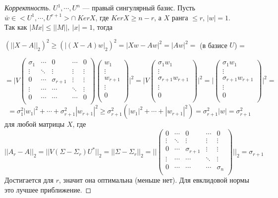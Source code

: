 \begin{proof}[Корректность]
$U^1,\cdots, U^n$ --- правый сингулярный базис.
Пусть $\bar w \in <U^1,\cdots,U^{r+1}> \cap~ Ker X$, где $Ker X \geqslant n-r$, а $X$ ранга $\leqslant r$, $|w|=1$.\\
Так как $|Mx|\leqslant ||M||,~|x|=1$, тогда \begin{center}
    $(||X-A||_2)^2 \geqslant(|(X-A)w|_2)^2=|Xw-Aw|^2=|Aw|^2=$ (в базисе $U$) =
\end{center}
\[=\Bigg| V\begin{pmatrix}
\sigma_1 & \cdots & 0  & \cdots & 0\\
\vdots & \ddots & \vdots & \vdots & \vdots\\
0 & \cdots & \sigma_{r+1} &  \vdots & \vdots\\
\vdots & \cdots & \cdots & \ddots & \vdots\\
0 & \cdots & \cdots & \cdots & 0\\
\end{pmatrix} \begin{pmatrix}
w_1\\
\vdots\\
w_{r+1}\\
\vdots\\
0\\
\end{pmatrix}\Bigg|^2 =\Bigg|V \begin{pmatrix}
\sigma_1 w_1\\
\vdots\\
\sigma_{r+1} w_{r+1}\\
\vdots\\
0\\
\end{pmatrix} \Bigg|^2 =\Bigg| \begin{pmatrix}
\sigma_1 w_1\\
\vdots\\
\sigma_{r+1} w_{r+1}\\
\vdots\\
0\\
\end{pmatrix} \Bigg|^2=\]$$=\sigma_1^2|w_1|^2+\cdots+\sigma_{r+1}^2|w_{r+1}|^2 \geqslant \sigma_{r+1}^2(|w_1|^2+\cdots+|w_{r+1}|^2)=\sigma_{r+1}^2|w|=\sigma_{r+1}^2$$ для любой матрицы $X$, где 
\[||A_r-A||_2=||V(\Sigma-\Sigma_r)U^*||_2=||\Sigma-\Sigma_r||_2 = \Bigg| \Bigg|\begin{pmatrix}
0 & \cdots & 0  & \cdots & 0\\
\vdots & \ddots & \vdots & \vdots & \vdots\\
0 & \cdots & \sigma_{r+1} &  \vdots & \vdots\\
\vdots & \cdots & \cdots & \ddots & \vdots\\
0 & \cdots & \cdots & \cdots & \sigma_n\\
\end{pmatrix}\Bigg|\Bigg|_2=\sigma_{r+1}\]
Достигается для $r$, значит она оптимальна (меньше нет). Для евклидовой нормы это лучшее приближение.
\end{proof}
